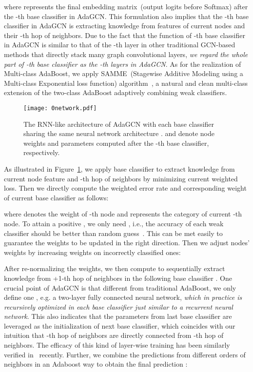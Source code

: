 \documentclass{article} \usepackage{iclr2021_conference,times}
\begin{document}
where  represents the final embedding matrix~(output logits before Softmax) after the -th base classifier in AdaGCN. This formulation also implies that the -th base classifier in AdaGCN is extracting knowledge from features of current nodes and their -th hop of neighbors. Due to the fact that the function of -th base classifier in AdaGCN is similar to that of the -th layer in other traditional GCN-based methods that directly stack many graph convolutional layers, \emph{we regard the whole part of -th base classifier as the -th layers in AdaGCN}. As for the realization of Multi-class AdaBoost, we apply SAMME~(Stagewise Additive Modeling using a Multi-class Exponential loss function) algorithm~\citep{hastie2009multi}, a natural and clean multi-class extension of the two-class AdaBoost  adaptively combining weak classifiers. 

\begin{figure}[t!]
	\centering
	\texttt{[image: 0network.pdf]}
	\caption{The RNN-like architecture of AdaGCN with each base classifier  sharing the same neural network architecture .  and  denote node weights and parameters computed after the -th base classifier, respectively.}
	\label{figure_network}
\end{figure}

As illustrated in Figure~\ref{figure_network}, we apply base classifier  to extract knowledge from current node feature and -th hop of neighbors by minimizing current weighted loss. Then we directly compute the weighted error rate  and corresponding weight  of current base classifier  as follows:

where  denotes the weight of -th node and  represents the category of current -th node. To attain a positive , we only need , i.e., the accuracy of each weak classifier should be better than random guess~\citep{hastie2009multi}. This can be met easily to guarantee the weights to be updated in the right direction. Then we adjust nodes' weights by increasing weights on incorrectly classified ones:
	
After re-normalizing the weights, we then compute  to sequentially extract knowledge from +1-th hop of neighbors in the following base classifier . One crucial point of AdaGCN is that different from traditional AdaBoost, we only define one , e.g. a two-layer fully connected neural network, \emph{which in practice is recursively optimized in each base classifier just similar to a recurrent neural network}. This also indicates that the parameters from last base classifier are leveraged as the initialization of next base classifier, which coincides with our intuition that -th hop of neighbors are directly connected from -th hop of neighbors. The efficacy of this kind of layer-wise training has been similarly verified in~\citep{belilovsky2018greedy} recently. Further, we combine the predictions from different orders of neighbors in an Adaboost way to obtain the final prediction :
\end{document}
